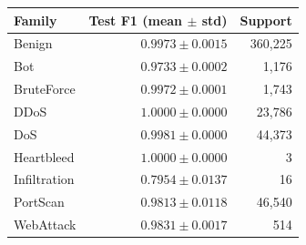 \begin{tabular}{lrr}
\toprule
Family & Test F1 (mean $\pm$ std) & Support \\
\midrule
Benign & $0.9973 \pm 0.0015$ & 360,225 \\
Bot & $0.9733 \pm 0.0002$ & 1,176 \\
BruteForce & $0.9972 \pm 0.0001$ & 1,743 \\
DDoS & $1.0000 \pm 0.0000$ & 23,786 \\
DoS & $0.9981 \pm 0.0000$ & 44,373 \\
Heartbleed & $1.0000 \pm 0.0000$ & 3 \\
Infiltration & $0.7954 \pm 0.0137$ & 16 \\
PortScan & $0.9813 \pm 0.0118$ & 46,540 \\
WebAttack & $0.9831 \pm 0.0017$ & 514 \\
\bottomrule
\end{tabular}